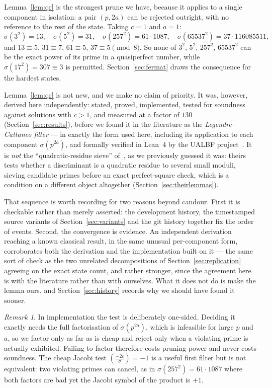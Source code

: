 \documentclass[11pt]{amsart}
\theoremstyle{remark}
\newtheorem{remark}[theorem]{Remark}
\begin{document}
Lemma~\ref{lem:qr} is the strongest prune we have, because it applies to a
single component in isolation: a pair $(p, 2a)$ can be rejected outright, with no
reference to the rest of the state. Taking $c = 1$ and $a = 1$:
\[
  \sigma(3^{2}) = 13,\quad \sigma(5^{2}) = 31,\quad
  \sigma(257^{2}) = 61 \cdot 1087,\quad \sigma(65537^{2}) = 37 \cdot 116085511,
\]
and $13 \equiv 5$, $31 \equiv 7$, $61 \equiv 5$, $37 \equiv 5 \pmod 8$. So none
of $3^{2}$, $5^{2}$, $257^{2}$, $65537^{2}$ can be the exact power of its prime
in a quasiperfect number, while $\sigma(17^{2}) = 307 \equiv 3$ is permitted.
Section~\ref{sec:fermat} draws the consequence for the hardest states.

Lemma~\ref{lem:qr} is not new, and we make no claim of priority. It was, however,
derived here independently: stated, proved, implemented, tested for soundness
against solutions with $c > 1$, and measured at a factor of $130$
(Section~\ref{sec:results}), before we found it in the literature as the
\emph{Legendre--Cattaneo filter} --- in exactly the form used here, including its
application to each component $\sigma(p^{2a})$, and formally verified in Lean~4 by
the UALBF project~\cite{ualbf}. It is \emph{not} the ``quadratic-residue sieve''
of~\cite{tty}, as we previously guessed it was: theirs tests whether a
discriminant is a quadratic residue to several small moduli, sieving candidate
primes before an exact perfect-square check, which is a condition on a different
object altogether (Section~\ref{sec:theirlemmas}).

That sequence is worth recording for two reasons beyond candour. First it is
checkable rather than merely asserted: the development history, the timestamped
source variants of Section~\ref{sec:variants} and the git history
together fix the order of events. Second, the convergence is evidence. An
independent derivation reaching a known classical result, in the same unusual
per-component form, corroborates both the derivation and the implementation
built on it --- the same sort of check as the two unrelated decompositions of
Section~\ref{sec:replication} agreeing on the exact state count, and rather
stronger, since the agreement here is with the literature rather than with
ourselves. What it does not do is make the lemma ours, and
Section~\ref{sec:history} records why we should have found it sooner.

\begin{remark}
In implementation the test is deliberately one-sided. Deciding it exactly needs
the full factorisation of $\sigma(p^{2a})$, which is infeasible for large $p$ and
$a$, so we factor only as far as is cheap and reject only when a violating prime
is actually exhibited. Failing to factor therefore costs pruning power and never
costs soundness. The cheap Jacobi test $\left(\frac{-2c}{\sigma}\right) = -1$ is
a useful first filter but is not equivalent: two violating primes can cancel, as
in $\sigma(257^{2}) = 61 \cdot 1087$ where both factors are bad yet the Jacobi
symbol of the product is $+1$.
\end{remark}
\end{document}
